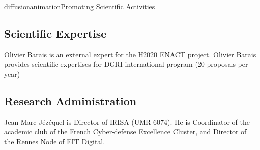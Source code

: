 \documentclass{ra2018}
\begin{document}
\begin{module}{diffusion}{animation}{Promoting Scientific Activities}
\subsection{Scientific Expertise}

Olivier Barais is an external expert for the H2020 ENACT project.  Olivier Barais provides scientific expertises for DGRI international program (20 proposals per year)


\subsection{Research Administration}
  
  Jean-Marc J\'ez\'equel is Director of IRISA (UMR 6074). He is 
  Coordinator of the academic club of the French Cyber-defense Excellence 
  Cluster, and Director of the Rennes Node of EIT Digital.
  
\end{module}
\end{document}
